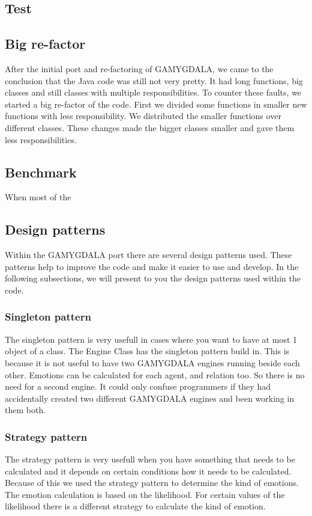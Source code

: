 \subsection{Test}

\subsection{Big re-factor}
After the initial port and re-factoring of GAMYGDALA, we came to the conclusion that the Java code was still not very pretty. It had long functions, big classes and still classes with multiple responsibilities. To counter these faults, we started a big re-factor of the code. First we divided some functions in smaller new functions with less responsibility. We distributed the smaller functions over different classes. These changes made the bigger classes smaller and gave them less responsibilities.  

\subsection{Benchmark}
When most of the 

\subsection{Design patterns}
Within the GAMYGDALA port there are several design patterns used. These patterns help to improve the code and make it easier to use and develop. In the following subsections, we will present to you the design patterns used within the code.

\subsubsection{Singleton pattern}
The singleton pattern is very usefull in cases where you want to have at most 1 object of a class. The Engine Class has the singleton pattern build in. This is because it is not useful to have two GAMYGDALA engines running beside each other. Emotions can be calculated for each agent, and relation too. So there is no need for a second engine. It could only confuse programmers if they had accidentally created two different GAMYGDALA engines and been working in them both.  
  
\subsubsection{Strategy pattern}
The strategy pattern is very usefull when you have something that needs to be calculated and it depends on certain conditions how it needs to be calculated. Because of this we used the strategy pattern to determine the kind of emotions. The emotion calculation is based on the likelihood. For certain values of the likelihood there is a different strategy to calculate the kind of emotion.